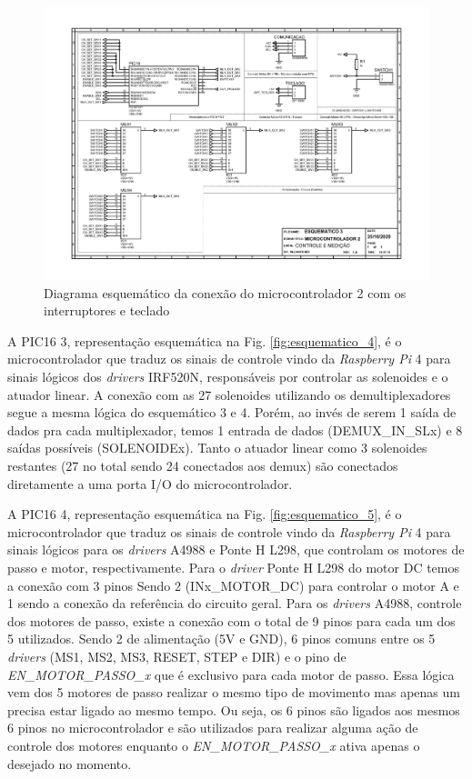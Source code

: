\begin{apendicesenv}
\begin{landscape}
\begin{figure}[H]
    \centering
    \includegraphics[width=1.25\textwidth, height=2\textheight,keepaspectratio]{figuras/eletronica/esquematicos/esquematico_3_micro2.pdf}
    \caption{Diagrama esquemático da conexão do microcontrolador 2 com os interruptores e teclado}
    \label{fig:esquematico_3}
\end{figure}
\end{landscape}

A PIC16 3, representação esquemática na Fig. \ref{fig:esquematico_4}, é o microcontrolador que traduz os sinais de controle vindo da \textit{Raspberry Pi} 4 para sinais lógicos dos \textit{drivers} IRF520N, responsáveis por controlar as solenoides e o atuador linear. A conexão com as 27 solenoides utilizando os demultiplexadores segue a mesma lógica do esquemático 3 e 4. Porém, ao invés de serem 1 saída de dados pra cada multiplexador, temos 1 entrada de dados (DEMUX\_IN\_SLx) e 8 saídas possíveis (SOLENOIDEx). Tanto o atuador linear como 3 solenoides restantes (27 no total sendo 24 conectados aos demux) são conectados diretamente a uma porta I/O do microcontrolador.

A PIC16 4, representação esquemática na Fig. \ref{fig:esquematico_5}, é o microcontrolador que traduz os sinais de controle vindo da \textit{Raspberry Pi} 4 para sinais lógicos para os \textit{drivers} A4988 e Ponte H L298, que controlam os motores de passo e motor, respectivamente. Para o \textit{driver} Ponte H L298 do motor DC temos a conexão com 3 pinos Sendo 2 (INx\_MOTOR\_DC) para controlar o motor A e 1 sendo a conexão da referência do circuito geral. Para os \textit{drivers} A4988, controle dos motores de passo, existe a conexão com o total de 9 pinos para cada um dos 5 utilizados. Sendo 2 de alimentação (5V e GND), 6 pinos comuns entre os 5 \textit{drivers} (MS1, MS2, MS3, RESET, STEP e DIR) e o pino de \textit{EN\_MOTOR\_PASSO\_x} que é exclusivo para cada motor de passo. Essa lógica vem dos 5 motores de passo realizar o mesmo tipo de movimento mas apenas um precisa estar ligado ao mesmo tempo. Ou seja, os 6 pinos são ligados aos mesmos 6 pinos no microcontrolador e são utilizados para realizar alguma ação de controle dos motores enquanto o \textit{EN\_MOTOR\_PASSO\_x} ativa apenas o desejado no momento.


\end{apendicesenv}
